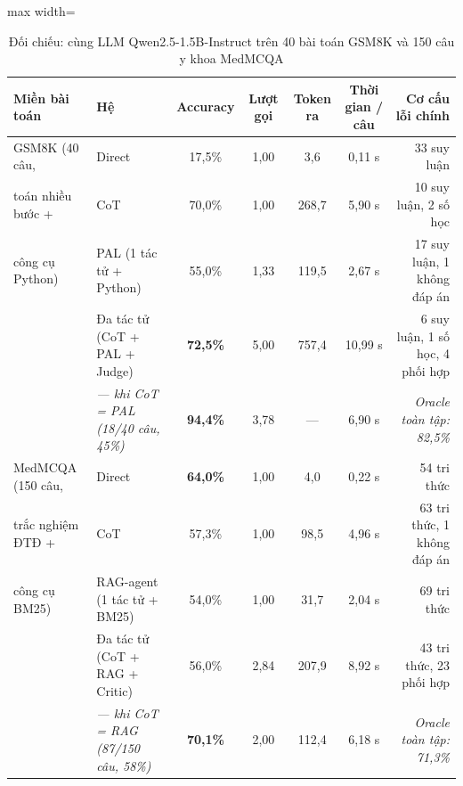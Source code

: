 \begin{table}[H]
\centering
\caption{Đối chiếu: cùng LLM Qwen2.5-1.5B-Instruct trên 40 bài toán GSM8K và 150 câu y khoa MedMCQA}
\label{tab:ch7-gsm8k}
\small
\begin{adjustbox}{max width=\linewidth}
\begin{tabular}{@{}llccccr@{}}
\toprule
\textbf{Miền bài toán} & \textbf{Hệ} & \textbf{Accuracy} & \textbf{Lượt gọi} & \textbf{Token ra} & \textbf{Thời gian / câu} & \textbf{Cơ cấu lỗi chính} \\
\midrule
GSM8K (40 câu, & Direct & 17,5\% & 1,00 & 3,6 & 0,11 s & 33 suy luận \\
toán nhiều bước + & CoT & 70,0\% & 1,00 & 268,7 & 5,90 s & 10 suy luận, 2 số học \\
công cụ Python) & PAL (1 tác tử + Python) & 55,0\% & 1,33 & 119,5 & 2,67 s & 17 suy luận, 1 không đáp án \\
 & Đa tác tử (CoT + PAL + Judge) & \textbf{72,5\%} & 5,00 & 757,4 & 10,99 s & 6 suy luận, 1 số học, 4 phối hợp \\
 & \emph{— khi CoT = PAL (18/40 câu, 45\%)} & \textbf{94,4\%} & 3,78 & — & 6,90 s & \emph{Oracle toàn tập: 82,5\%} \\
\midrule
MedMCQA (150 câu, & Direct & \textbf{64,0\%} & 1,00 & 4,0 & 0,22 s & 54 tri thức \\
trắc nghiệm ĐTĐ + & CoT & 57,3\% & 1,00 & 98,5 & 4,96 s & 63 tri thức, 1 không đáp án \\
công cụ BM25) & RAG-agent (1 tác tử + BM25) & 54,0\% & 1,00 & 31,7 & 2,04 s & 69 tri thức \\
 & Đa tác tử (CoT + RAG + Critic) & 56,0\% & 2,84 & 207,9 & 8,92 s & 43 tri thức, 23 phối hợp \\
 & \emph{— khi CoT = RAG (87/150 câu, 58\%)} & \textbf{70,1\%} & 2,00 & 112,4 & 6,18 s & \emph{Oracle toàn tập: 71,3\%} \\
\bottomrule
\end{tabular}
\end{adjustbox}
\end{table}



